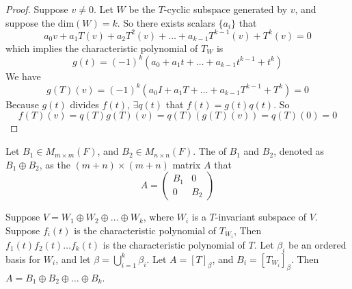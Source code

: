 \begin{proof}
    Suppose $v \neq 0$. Let $W$ be the $T$-cyclic subspace generated by $v$, and suppose the $\text{dim}(W)=k$. So there exists scalars $\{a_i\}$ that 
    \begin{equation*}
        a_0 v + a_1 T(v) + a_2 T^2(v) + \dots + a_{k-1} T^{k-1}(v) + T^k(v) = 0
    \end{equation*}
    which implies the characteristic polynomial of $T_W$ is
    \begin{equation*}
        g(t) = (-1)^k (a_0 + a_1 t + \dots + a_{k-1} t^{k-1} + t^k)
    \end{equation*}
    We have
    \begin{equation*}
        g(T)(v) = (-1)^k (a_0 I + a_1 T + \dots + a_{k-1} T^{k-1} + T^k) = 0
    \end{equation*}
    Because $g(t)$ divides $f(t)$, $\exists q(t)$ that $f(t) = g(t) q(t)$. So
    \begin{equation*}
        f(T)(v) = q(T)g(T)(v) = q(T) (g(T)(v)) = q(T)(0) = 0
    \end{equation*}
\end{proof}



\begin{definition}
    Let $B_1 \in M_{m \times m}(F)$, and $B_2 \in M_{n \times n} (F)$. The  of $B_1$ and $B_2$, denoted as $B_1 \oplus B_2$, as the $(m+n) \times (m+n)$ matrix $A$ that
    \begin{equation*}
        A = \begin{pmatrix}
            B_1 & 0 \\
            0 & B_2
        \end{pmatrix}
    \end{equation*}
\end{definition}


\begin{theorem}
    Suppose $V=W_1 \oplus W_2 \oplus \dots \oplus W_k$, where $W_i$ is a $T$-invariant subspace of $V$. Suppose $f_i(t)$ is the characteristic polynomial of $T_{W_i}$, Then $f_1(t) f_2(t) \dots f_k(t)$ is the characteristic polynomial of $T$. Let $\beta_i$ be an ordered basis for $W_i$, and let $\beta = \bigcup_{i=1}^k \beta_i$. Let $A=[T]_\beta$, and $B_i=[T_{W_i}]_\beta$. Then $A = B_1 \oplus B_2 \oplus \dots \oplus B_k$.
\end{theorem}